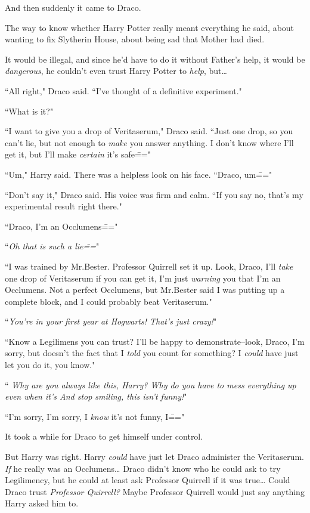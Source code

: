 And then suddenly it came to Draco.

The way to know whether Harry Potter really meant everything he said, about wanting to fix Slytherin House, about being sad that Mother had died.

It would be illegal, and since he'd have to do it without Father's help, it would be \emph{dangerous}, he couldn't even trust Harry Potter to \emph{help}, but{\ldots}

``All right," Draco said. ``I've thought of a definitive experiment."

``What is it?"

``I want to give you a drop of Veritaserum," Draco said. ``Just one drop, so you can't lie, but not enough to \emph{make} you answer anything. I don't know where I'll get it, but I'll make \emph{certain} it's safe\==="

``Um," Harry said. There was a helpless look on his face. ``Draco, um\==="

``Don't say it," Draco said. His voice was firm and calm. ``If you say no, that's my experimental result right there."

``Draco, I'm an Occlumens\==="

``\emph{Oh that is such a lie\===}"

``I was trained by Mr.\?Bester. Professor Quirrell set it up. Look, Draco, I'll \emph{take} one drop of Veritaserum if you can get it, I'm just \emph{warning} you that I'm an Occlumens. Not a perfect Occlumens, but Mr.\?Bester said I was putting up a complete block, and I could probably beat Veritaserum."

``\emph{You're in your first year at Hogwarts! That's just crazy!}"

``Know a Legilimens you can trust? I'll be happy to demonstrate\---look, Draco, I'm sorry, but doesn't the fact that I \emph{told} you count for something? I \emph{could} have just let you do it, you know."

``\emph{ Why are you always like this, Harry? Why do you have to mess everything up even when it's  And stop smiling, this isn't funny!}"

``I'm sorry, I'm sorry, I \emph{know} it's not funny, I\==="

It took a while for Draco to get himself under control.

But Harry was right. Harry \emph{could} have just let Draco administer the Veritaserum. \emph{If} he really was an Occlumens{\ldots} Draco didn't know who he could ask to try Legilimency, but he could at least ask Professor Quirrell if it was true{\ldots} Could Draco trust \emph{Professor Quirrell?} Maybe Professor Quirrell would just say anything Harry asked him to.

